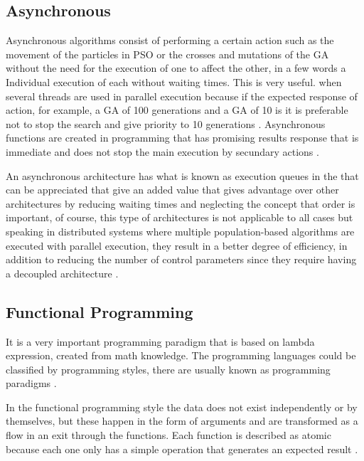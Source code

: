 \documentclass[runningheads]{llncs}
\begin{document}
\subsection{Asynchronous}

Asynchronous algorithms consist of performing a certain action such as the
movement of the particles in PSO or the crosses and mutations of the GA without
the need for the execution of one to affect the other, in a few words a
Individual execution of each without waiting times. This is very useful. when
several threads are used in parallel execution because if the expected response
of action, for example, a GA of 100 generations and a GA of 10 is it is
preferable not to stop the search and give priority to 10 generations
\cite{Santander-jim2018,Sherry2012,Goebel2016,Guerv2018}. Asynchronous functions
are created in programming that has promising results response that is immediate
and does not stop the main execution by secundary actions
\cite{Moroney2017,Ambler2015}.

An asynchronous architecture has what is known as execution queues in the that
can be appreciated that give an added value that gives advantage over other
architectures by reducing waiting times and neglecting the concept that order is
important, of course, this type of architectures is not applicable to all cases
but speaking in distributed systems where multiple population-based algorithms
are executed with parallel execution, they result in a better degree of
efficiency, in addition to reducing the number of control parameters since they
require having a decoupled architecture \cite{Ma2019,Santander-jim2018}.

\subsection{Functional Programming}

It is a very important programming paradigm that is based on lambda expression,
created from math knowledge. The programming languages could be classified by
programming styles, there are usually known as programming paradigms
\cite{Kunasaikaran2016}.

In the functional programming style the data does not exist independently or by
themselves, but these happen in the form of arguments and are transformed as a
flow in an exit through the functions. Each function is described as atomic
because each one only has a simple operation that generates an expected result
\cite{Kunasaikaran2016}.
\end{document}
